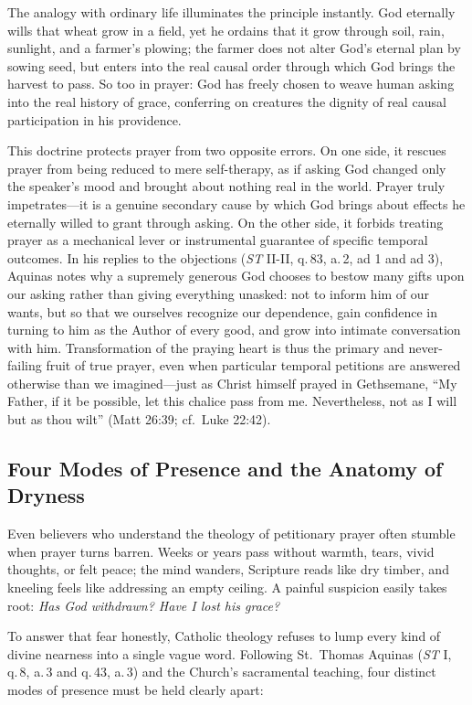 The analogy with ordinary life illuminates the principle instantly. God eternally wills that wheat grow in a field, yet he ordains that it grow through soil, rain, sunlight, and a farmer's plowing; the farmer does not alter God's eternal plan by sowing seed, but enters into the real causal order through which God brings the harvest to pass. So too in prayer: God has freely chosen to weave human asking into the real history of grace, conferring on creatures the dignity of real causal participation in his providence.

This doctrine protects prayer from two opposite errors. On one side, it rescues prayer from being reduced to mere self-therapy, as if asking God changed only the speaker's mood and brought about nothing real in the world. Prayer truly impetrates---it is a genuine secondary cause by which God brings about effects he eternally willed to grant through asking. On the other side, it forbids treating prayer as a mechanical lever or instrumental guarantee of specific temporal outcomes. In his replies to the objections (\emph{ST} II-II, q.\,83, a.\,2, ad 1 and ad 3), Aquinas notes why a supremely generous God chooses to bestow many gifts upon our asking rather than giving everything unasked: not to inform him of our wants, but so that we ourselves recognize our dependence, gain confidence in turning to him as the Author of every good, and grow into intimate conversation with him. Transformation of the praying heart is thus the primary and never-failing fruit of true prayer, even when particular temporal petitions are answered otherwise than we imagined---just as Christ himself prayed in Gethsemane, ``My Father, if it be possible, let this chalice pass from me. Nevertheless, not as I will but as thou wilt'' (Matt 26:39; cf.\ Luke 22:42).

\subsection*{Four Modes of Presence and the Anatomy of Dryness}

Even believers who understand the theology of petitionary prayer often stumble when prayer turns barren. Weeks or years pass without warmth, tears, vivid thoughts, or felt peace; the mind wanders, Scripture reads like dry timber, and kneeling feels like addressing an empty ceiling. A painful suspicion easily takes root: \emph{Has God withdrawn? Have I lost his grace?}

To answer that fear honestly, Catholic theology refuses to lump every kind of divine nearness into a single vague word. Following St.\ Thomas Aquinas (\emph{ST} I, q.\,8, a.\,3 and q.\,43, a.\,3) and the Church's sacramental teaching, four distinct modes of presence must be held clearly apart:

